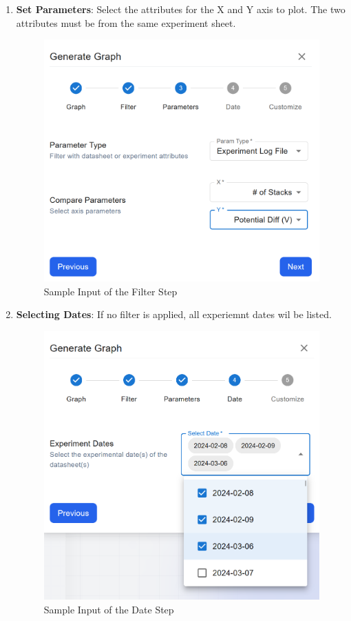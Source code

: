 \documentclass[12pt]{article}
\begin{document}
\begin{enumerate}
    \item \textbf{Set Parameters}: \newline
    Select the attributes for the X and Y axis to plot. The two attributes must
    be from the same experiment sheet. 
    \begin{figure}[H]
        \centering
        \includegraphics[scale=0.4]{./Diagrams/graph-param.png}
        \caption{Sample Input of the Filter Step}
        \label{fig:params}
    \end{figure}

    \item \textbf{Selecting Dates}: \newline
    If no filter is applied, all experiemnt dates wil be listed. 
    \begin{figure}[H]
        \centering
        \includegraphics[scale=0.4]{./Diagrams/graph-dates.png}
        \caption{Sample Input of the Date Step}
        \label{fig:dates}
    \end{figure}
    

\end{enumerate}
\end{document}
